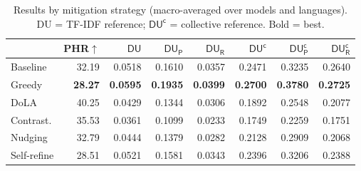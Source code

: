 \begin{table}[ht]
\centering
\small
\caption{Results by mitigation strategy (macro-averaged over models and languages). DU = TF-IDF reference; $\mathsf{DU^c}$ = collective reference. Bold = best.}
\label{tab:by_strategy}
\begin{tabular}{lrrrrrrr}
\toprule
 & PHR$\uparrow$ & $\mathsf{DU}$ & $\mathsf{DU_P}$ & $\mathsf{DU_R}$ & $\mathsf{DU^c}$ & $\mathsf{DU^c_P}$ & $\mathsf{DU^c_R}$ \\
\midrule
  Baseline & 32.19 & 0.0518 & 0.1610 & 0.0357 & 0.2471 & 0.3235 & 0.2640 \\
  Greedy & \textbf{28.27} & \textbf{0.0595} & \textbf{0.1935} & \textbf{0.0399} & \textbf{0.2700} & \textbf{0.3780} & \textbf{0.2725} \\
  DoLA & 40.25 & 0.0429 & 0.1344 & 0.0306 & 0.1892 & 0.2548 & 0.2077 \\
  Contrast. & 35.53 & 0.0361 & 0.1099 & 0.0233 & 0.1749 & 0.2259 & 0.1751 \\
  Nudging & 32.79 & 0.0444 & 0.1379 & 0.0282 & 0.2128 & 0.2909 & 0.2068 \\
  Self-refine & 28.51 & 0.0521 & 0.1581 & 0.0343 & 0.2396 & 0.3206 & 0.2388 \\
\bottomrule
\end{tabular}
\end{table}